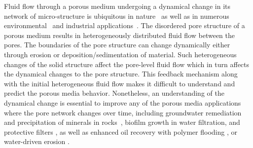 \documentclass[%
reprint,
 amsmath,amssymb,
 aps,
prl,
]{revtex4-1}
\begin{document}
Fluid flow through a porous medium undergoing a dynamical change in its network of micro-structure is ubiquitous in nature~\cite{marbach2016pruning,alim2013random,tero2010rules,heaton2010growth} as well as in numerous environmental~\cite{schlesinger1999carbon,winkler1979pore,batzle1992seismic} and industrial applications~\cite{duduta2011semi,sun2019hierarchical,smith2017multiphase,ferguson2012nonequilibrium}.
The disordered pore structure of a porous medium results in heterogeneously distributed fluid flow between the pores.
The boundaries of the pore structure can change dynamically either through erosion or deposition/sedimentation of material. Such heterogeneous changes of the solid structure affect the pore-level fluid flow which in turn affects the dynamical changes to the pore structure. This feedback mechanism along with the initial heterogeneous fluid flow makes it difficult to understand and predict the porous media behavior. Nonetheless, an understanding of the dynamical change is essential to improve any of the porous media applications where the pore network changes over time, including groundwater remediation and precipitation of minerals in rocks~\cite{rad2013pore}, biofilm growth in water filtration, and protective filters \cite{herzig1970flow,tien1979advances,jaisi2008transport,carrel2018biofilms,seymour2004anomalous}, as well as enhanced oil recovery with polymer flooding \cite{lake2014fundamentals,parsa2020origin}, or water-driven erosion \cite{schorghofer2004spontaneous,mahadevan2012flow}. 
\end{document}
